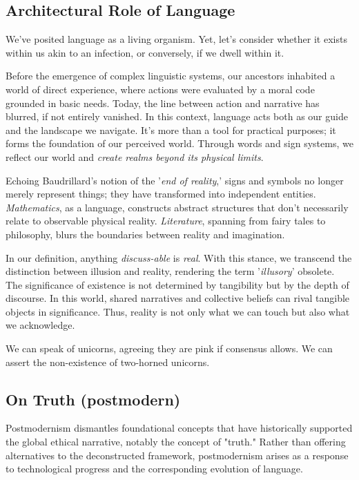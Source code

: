 \documentclass[11pt,a4]{article}
\begin{document}
\subsection{Architectural Role of Language}
        We've posited language as a living organism. Yet, let's consider whether it exists within us akin to an infection, or conversely, if we dwell within it.
        \par
        Before the emergence of complex linguistic systems, our ancestors inhabited a world of direct experience, where actions were evaluated by a moral code grounded in basic needs. Today, the line between action and narrative has blurred, if not entirely vanished. In this context, language acts both as our guide and the landscape we navigate. It's more than a tool for practical purposes; it forms the foundation of our perceived world. Through words and sign systems, we reflect our world and \textit{create realms beyond its physical limits}.

        \par
        Echoing Baudrillard's notion of the '\textit{end of reality},' signs and symbols no longer merely represent things; they have transformed into independent entities.
        \textit{Mathematics}, as a language, constructs abstract structures that don't necessarily relate to observable physical reality. \textit{Literature}, spanning from fairy tales to philosophy, blurs the boundaries between reality and imagination.

        \par
        In our definition, anything\textit{ discuss-able} is \textit{real}. With this stance, we transcend the distinction between illusion and reality, rendering the term '\textit{illusory}' obsolete. The significance of existence is not determined by tangibility but by the depth of discourse. In this world, shared narratives and collective beliefs can rival tangible objects in significance. Thus, reality is not only what we can touch but also what we acknowledge.
        \par
        We can speak of unicorns, agreeing they are pink if consensus allows. We can assert the non-existence of two-horned unicorns.

\subsection{On Truth (postmodern)}
Postmodernism dismantles foundational concepts that have historically supported the global ethical narrative, notably the concept of "truth." Rather than offering alternatives to the deconstructed framework, postmodernism arises as a response to technological progress and the corresponding evolution of language.
\end{document}
